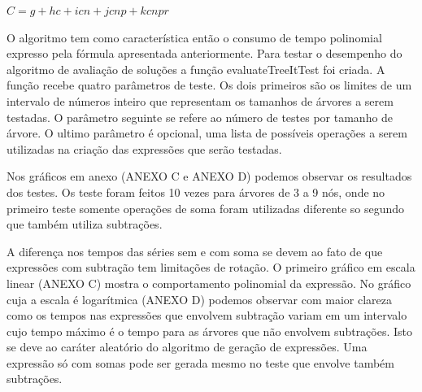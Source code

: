 $C = g + hc + icn + jcnp + kcnpr$

O algoritmo tem como característica então o consumo de tempo polinomial expresso pela fórmula apresentada anteriormente. Para testar o desempenho do algoritmo de avaliação de soluções a função evaluateTreeItTest foi criada. A função recebe quatro parâmetros de teste. Os dois primeiros são os limites de um intervalo de números inteiro que representam os tamanhos de árvores a serem testadas. O parâmetro seguinte se refere ao número de testes por tamanho de árvore. O ultimo parâmetro é opcional, uma lista de possíveis operações a serem utilizadas na criação das expressões que serão testadas.

	Nos gráficos em anexo (ANEXO C e ANEXO D) podemos observar os resultados dos testes. Os teste foram feitos 10 vezes para árvores de 3 a 9 nós, onde no primeiro teste somente operações de soma foram utilizadas diferente so segundo que também utiliza subtrações.

A diferença nos tempos das séries sem e com soma se devem ao fato de que expressões com subtração tem limitações de rotação. O primeiro gráfico em escala linear (ANEXO C) mostra o comportamento polinomial da expressão. No gráfico cuja a escala é logarítmica (ANEXO D) podemos observar com maior clareza como os tempos nas expressões que envolvem subtração variam em um intervalo cujo tempo máximo é o tempo para as árvores que não envolvem subtrações. Isto se deve ao caráter aleatório do algoritmo de geração de expressões. Uma expressão só com somas pode ser gerada mesmo no teste que envolve também subtrações.
